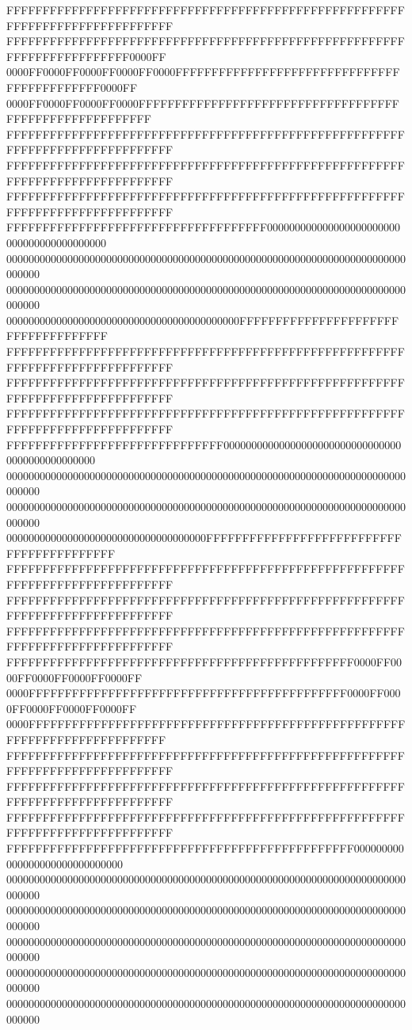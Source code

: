 FFFFFFFFFFFFFFFFFFFFFFFFFFFFFFFFFFFFFFFFFFFFFFFFFFFFFFFFFFFFFFFFFFFFFFFFFFFFFF
FFFFFFFFFFFFFFFFFFFFFFFFFFFFFFFFFFFFFFFFFFFFFFFFFFFFFFFFFFFFFFFFFFFFFFFF0000FF
0000FF0000FF0000FF0000FF0000FFFFFFFFFFFFFFFFFFFFFFFFFFFFFFFFFFFFFFFFFFFF0000FF
0000FF0000FF0000FF0000FFFFFFFFFFFFFFFFFFFFFFFFFFFFFFFFFFFFFFFFFFFFFFFFFFFFFFFF
FFFFFFFFFFFFFFFFFFFFFFFFFFFFFFFFFFFFFFFFFFFFFFFFFFFFFFFFFFFFFFFFFFFFFFFFFFFFFF
FFFFFFFFFFFFFFFFFFFFFFFFFFFFFFFFFFFFFFFFFFFFFFFFFFFFFFFFFFFFFFFFFFFFFFFFFFFFFF
FFFFFFFFFFFFFFFFFFFFFFFFFFFFFFFFFFFFFFFFFFFFFFFFFFFFFFFFFFFFFFFFFFFFFFFFFFFFFF
FFFFFFFFFFFFFFFFFFFFFFFFFFFFFFFFFFFF000000000000000000000000000000000000000000
000000000000000000000000000000000000000000000000000000000000000000000000000000
000000000000000000000000000000000000000000000000000000000000000000000000000000
000000000000000000000000000000000000000000FFFFFFFFFFFFFFFFFFFFFFFFFFFFFFFFFFFF
FFFFFFFFFFFFFFFFFFFFFFFFFFFFFFFFFFFFFFFFFFFFFFFFFFFFFFFFFFFFFFFFFFFFFFFFFFFFFF
FFFFFFFFFFFFFFFFFFFFFFFFFFFFFFFFFFFFFFFFFFFFFFFFFFFFFFFFFFFFFFFFFFFFFFFFFFFFFF
FFFFFFFFFFFFFFFFFFFFFFFFFFFFFFFFFFFFFFFFFFFFFFFFFFFFFFFFFFFFFFFFFFFFFFFFFFFFFF
FFFFFFFFFFFFFFFFFFFFFFFFFFFFFF000000000000000000000000000000000000000000000000
000000000000000000000000000000000000000000000000000000000000000000000000000000
000000000000000000000000000000000000000000000000000000000000000000000000000000
000000000000000000000000000000000000FFFFFFFFFFFFFFFFFFFFFFFFFFFFFFFFFFFFFFFFFF
FFFFFFFFFFFFFFFFFFFFFFFFFFFFFFFFFFFFFFFFFFFFFFFFFFFFFFFFFFFFFFFFFFFFFFFFFFFFFF
FFFFFFFFFFFFFFFFFFFFFFFFFFFFFFFFFFFFFFFFFFFFFFFFFFFFFFFFFFFFFFFFFFFFFFFFFFFFFF
FFFFFFFFFFFFFFFFFFFFFFFFFFFFFFFFFFFFFFFFFFFFFFFFFFFFFFFFFFFFFFFFFFFFFFFFFFFFFF
FFFFFFFFFFFFFFFFFFFFFFFFFFFFFFFFFFFFFFFFFFFFFFFF0000FF0000FF0000FF0000FF0000FF
0000FFFFFFFFFFFFFFFFFFFFFFFFFFFFFFFFFFFFFFFFFFFF0000FF0000FF0000FF0000FF0000FF
0000FFFFFFFFFFFFFFFFFFFFFFFFFFFFFFFFFFFFFFFFFFFFFFFFFFFFFFFFFFFFFFFFFFFFFFFFFF
FFFFFFFFFFFFFFFFFFFFFFFFFFFFFFFFFFFFFFFFFFFFFFFFFFFFFFFFFFFFFFFFFFFFFFFFFFFFFF
FFFFFFFFFFFFFFFFFFFFFFFFFFFFFFFFFFFFFFFFFFFFFFFFFFFFFFFFFFFFFFFFFFFFFFFFFFFFFF
FFFFFFFFFFFFFFFFFFFFFFFFFFFFFFFFFFFFFFFFFFFFFFFFFFFFFFFFFFFFFFFFFFFFFFFFFFFFFF
FFFFFFFFFFFFFFFFFFFFFFFFFFFFFFFFFFFFFFFFFFFFFFFF000000000000000000000000000000
000000000000000000000000000000000000000000000000000000000000000000000000000000
000000000000000000000000000000000000000000000000000000000000000000000000000000
000000000000000000000000000000000000000000000000000000000000000000000000000000
000000000000000000000000000000000000000000000000000000000000000000000000000000
000000000000000000000000000000000000000000000000000000000000000000000000000000
